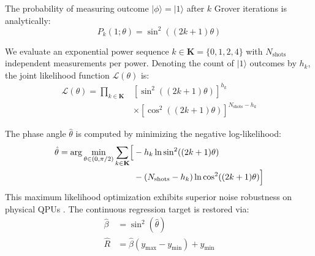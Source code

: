 \documentclass[conference]{IEEEtran}
\begin{document}
The probability of measuring outcome $|\phi\rangle = |1\rangle$ after $k$ Grover iterations is analytically:
\begin{equation}\label{eq12}
P_k(1; \theta) = \sin^2((2k + 1)\theta)
\end{equation}

We evaluate an exponential power sequence $k \in \mathbf{K} = \{0, 1, 2, 4\}$ with $N_{\text{shots}}$ independent measurements per power. Denoting the count of $|1\rangle$ outcomes by $h_k$, the joint likelihood function $\mathcal{L}(\theta)$ is:
\begin{equation}\label{eq13}
\begin{aligned}
\mathcal{L}(\theta) = \prod_{k \in \mathbf{K}} &\left[\sin^2((2k + 1)\theta)\right]^{h_k} \\
&\times \left[\cos^2((2k + 1)\theta)\right]^{N_{\text{shots}} - h_k}
\end{aligned}
\end{equation}

The phase angle $\hat{\theta}$ is computed by minimizing the negative log-likelihood:
\begin{equation}\label{eq14}
\begin{aligned}
\hat{\theta} = \arg\min_{\theta \in (0, \pi/2)} \sum_{k \in \mathbf{K}} \Bigl[ 
  &- h_k \ln \sin^2((2k + 1)\theta) \\
  &- (N_{\text{shots}} - h_k) \ln \cos^2((2k + 1)\theta) \Bigr]
\end{aligned}
\end{equation}
This maximum likelihood optimization exhibits superior noise robustness on physical QPUs \cite{tanaka2022amplitude}. The continuous regression target is restored via:
\begin{equation}\label{eq15}
\begin{aligned}
\hat{\beta} &= \sin^2(\hat{\theta}) \\
\hat{R} &= \hat{\beta}(y_{\max} - y_{\min}) + y_{\min}
\end{aligned}
\end{equation}
\end{document}
